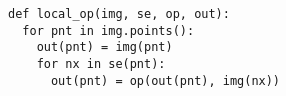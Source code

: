 \documentclass[varwidth=5.5cm, border={0.1cm 0.1cm 0.1cm 0.1cm}]{standalone}
\begin{document}
\begin{verbatim}
def local_op(img, se, op, out):
  for pnt in img.points():
    out(pnt) = img(pnt)
    for nx in se(pnt):
      out(pnt) = op(out(pnt), img(nx))
\end{verbatim}
\end{document}

